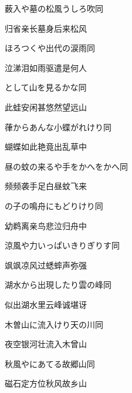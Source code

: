 \begin{haiku}
    {\FH 薮入や墓の松風うしろ吹}\hfill{\FH 同}

    {\FK 归省亲长墓身后来松风}
\end{haiku}

\begin{haiku}
    {\FH ほろつくや出代の涙雨}\hfill{\FH 同}

    {\FK 泣涕泪如雨驱遣是何人}
\end{haiku}

\begin{haiku}
    {\FH {}として山を見るかな}\hfill{\FH 同}

    {\FK 此蛙安闲甚悠然望远山}
\end{haiku}

\begin{haiku}
    {\FH 葎からあんな小蝶がれけり}\hfill{\FH 同}

    {\FK 蝴蝶如此艳竟出乱草中}
\end{haiku}

\begin{haiku}
    {\FH 昼の蚊の来るや手をかへをかへ}\hfill{\FH 同}

    {\FK 频频袭手足白昼蚊飞来}
\end{haiku}

\begin{haiku}
    {\FH {}の子の鳴舟にもどりけり}\hfill{\FH 同}

    {\FK 幼鹈离亲鸟悲泣归舟中}
\end{haiku}

\begin{haiku}
    {\FH 涼風や力いっぱいきりぎりす}\hfill{\FH 同}

    {\FK 飒飒凉风过蟋蟀声弥强}
\end{haiku}

\begin{haiku}
    {\FH 湖水から出現したり雲の峰}\hfill{\FH 同}

    {\FK 似出湖水里云峰诚堪讶}
\end{haiku}

\begin{haiku}
    {\FH 木曽山に流入けり天の川}\hfill{\FH 同}

    {\FK 夜空银河壮流入木曾山}
\end{haiku}

\begin{haiku}
    {\FH 秋風やにあてる故郷山}\hfill{\FH 同}

    {\FK 磁石定方位秋风故乡山}
\end{haiku}

